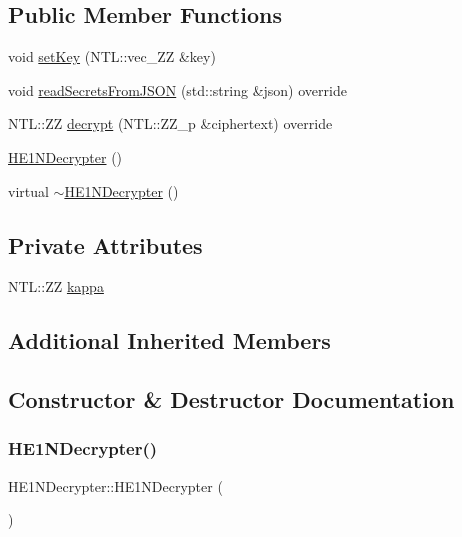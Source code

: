 \subsection*{Public Member Functions}
\begin{DoxyCompactItemize}
\item 
void \hyperlink{classHE1NDecrypter_a35a7d0c2ce869f417d6dc90792e61e11}{set\+Key} (N\+T\+L\+::vec\+\_\+\+ZZ \&key)
\item 
void \hyperlink{classHE1NDecrypter_a323f074a37cb4ebfbcfca4b6bdfb6737}{read\+Secrets\+From\+J\+S\+ON} (std\+::string \&json) override
\item 
N\+T\+L\+::\+ZZ \hyperlink{classHE1NDecrypter_a8e49ff8292a76884f328c566f4d1b646}{decrypt} (N\+T\+L\+::\+Z\+Z\+\_\+p \&ciphertext) override
\item 
\hyperlink{classHE1NDecrypter_a4aa5f1ecf0f7e0dcc3ea6e0073ac5e3a}{H\+E1\+N\+Decrypter} ()
\item 
virtual \hyperlink{classHE1NDecrypter_ae9d3f1b8d0012b99d12d24c0cc69d87e}{$\sim$\+H\+E1\+N\+Decrypter} ()
\end{DoxyCompactItemize}
\subsection*{Private Attributes}
\begin{DoxyCompactItemize}
\item 
N\+T\+L\+::\+ZZ \hyperlink{classHE1NDecrypter_a409fafa4eaf8d73998d6fee08ce4a8e2}{kappa}
\end{DoxyCompactItemize}
\subsection*{Additional Inherited Members}


\subsection{Constructor \& Destructor Documentation}
\mbox{\label{classHE1NDecrypter_a4aa5f1ecf0f7e0dcc3ea6e0073ac5e3a}} 
\subsubsection{\texorpdfstring{H\+E1\+N\+Decrypter()}{HE1NDecrypter()}}
{\footnotesize\ttfamily H\+E1\+N\+Decrypter\+::\+H\+E1\+N\+Decrypter (\begin{DoxyParamCaption}{ }\end{DoxyParamCaption})\hspace{0.3cm}{\ttfamily [inline]}}

